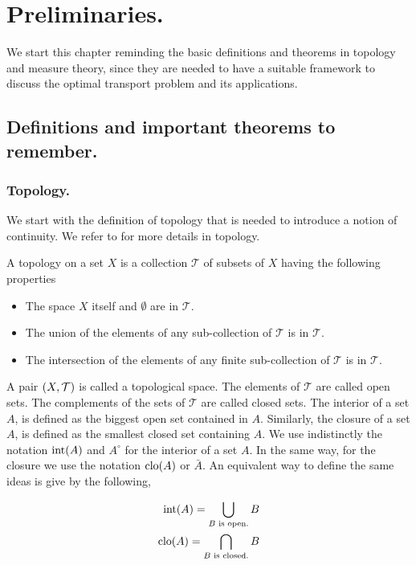 \chapter{Preliminaries.}
We start this chapter reminding the basic definitions and theorems in topology and measure theory, since they are needed to have a suitable framework to discuss the optimal transport problem and its applications.

 
\section{Definitions and important theorems to remember.}

\subsection{Topology.}
We start with the definition of topology that is needed to introduce a notion of continuity. We refer to \cite{munkres2000topology} for more details in topology.

\begin{definition}[Topology]
	A topology on a set $X$ is a collection $\mathcal T$ of subsets of $X$ having the following properties
	\begin{itemize}
		\item  The space $X$ itself and $\emptyset$ are in $\mathcal T$.
		\item  The union of the elements of any sub-collection of $\mathcal T$ is in $\mathcal T$.
		\item The intersection of the elements of any finite sub-collection of $\mathcal T$ is in $\mathcal T$.
	\end{itemize}
\end{definition}

A pair $\left( X, \mathcal{T} \right)$ is called a topological space. The elements of $\mathcal T$ are called open sets. The complements of the sets of $\mathcal T$ are called closed sets. The interior of a set $A$, is defined as the biggest open set contained in $A$. Similarly, the closure of a set $A$, is defined as the smallest closed set containing $A$. We use indistinctly the notation $\mathrm{int}(A)$ and $A^{\circ}$ for the interior of a set $A$. In the same way, for the closure we use the notation $\mathrm{clo}(A)$ or $\bar{A}$. An equivalent way to define the same ideas is give by the following,

\begin{align*}
	\mathrm{int}(A)=\bigcup_{B \text{ is open.}} B \\
	\mathrm{clo}(A)=\bigcap_{B \text{ is closed.}} B
\end{align*}

